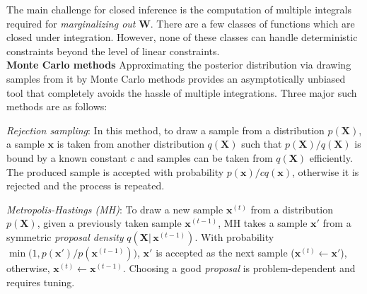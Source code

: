 \documentclass{article}
\newcommand{\bvec}[1]{\textbf{#1}}
\newcommand{\pr}{p}
\begin{document}
The main challenge for closed inference is the computation of multiple integrals required for \emph{marginalizing {\color{green}out}} $\bvec{W}$.
There are a few classes of functions which are closed under integration.
However, none of these classes can handle deterministic constraints beyond the level of linear constraints.
\\
\textbf{Monte Carlo methods}
Approximating the posterior distribution via drawing samples from it by Monte Carlo methods 
provides an asymptotically unbiased tool that completely avoids the hassle of multiple integrations.%
Three major such methods are as follows:

\emph{Rejection sampling}: In this method, to draw a sample from 
a distribution $p(\bvec{X})$, a sample $\bvec{x}$ is taken from another distribution $q(\bvec{X})$
such that $p(\bvec{X})/q(\bvec{X})$ is bound by a known constant $c$
and samples can be taken from $q(\bvec{X})$ efficiently.
The produced sample is accepted with probability $p(\bvec{x}) / c q(\bvec{x})$, 
otherwise it is rejected and the process is repeated. 

\emph{Metropolis-Hastings (MH)}:
To draw a new sample $\bvec{x}^{(t)}$ from a distribution $p(\bvec{X})$, given a previously taken sample $\bvec{x}^{(t-1)}$, 
MH takes a sample $\bvec{x}'$ from a symmetric \emph{proposal density} $q(\bvec{X} |\, \bvec{x}^{(t-1)})$. 
With probability $\min \big(1, p(\bvec{x}')/p(\bvec{x}^{(t-1)}) \big)$, 
$\bvec{x}'$ is accepted as the next sample ($\bvec{x}^{(t)} \leftarrow \bvec{x}'$), otherwise, $\bvec{x}^{(t)} \leftarrow \bvec{x}^{(t-1)}$. 
Choosing a good \emph{proposal} is problem-dependent and requires tuning. 
\end{document}
